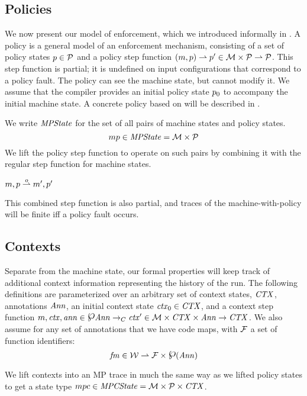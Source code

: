 \documentclass[acmsmall,review,anonymous]{acmart}\settopmatter{printfolios=true,printccs=false,printacmref=false}
\newcommand{\powerset}{\raisebox{.15\baselineskip}{\Large\ensuremath{\wp}}}
\begin{document}
\subsection{Policies}

We now present our model of enforcement, which we introduced informally in .
A policy is a general model of an enforcement mechanism, consisting of a set of policy
states \(\pol \in \POLS\) and a policy step function \((\mach, \pol) \polstep \pol' \in
\MACHS \times \POLS \rightharpoonup \POLS\). This step function is partial;
it is undefined on input configurations that correspond to a policy fault. The policy
can see the machine state, but cannot modify it. We assume that the
compiler provides an initial policy state \(\pol_0\) to accompany the initial machine state.
%
A concrete policy based on \citet{DBLP:conf/sp/RoesslerD18} will be described in
.

We write $\MPS$ for the set of all pairs of machine states and policy
states.
%
\[\mpstatename \in \MPS = \MACHS \times \POLS\]
%
We lift the policy step function to operate on such pairs
by combining it with the regular step function for machine states.

            {\(\mpstate{\mach}{\pol} \stepstopol[\obs]
               \mpstate{\mach'}{\pol'}\)}

This combined step function is also partial, and traces of the machine-with-policy
will be finite iff a policy fault occurs.

\subsection{Contexts}

Separate from the machine state, our formal properties will keep track of additional context
information representing the history of the run. The following definitions are parameterized
over an arbitrary set of context states, \(\CONTEXTS\), annotations \(\ANNS\),
an initial context state \(\context_0 \in \CONTEXTS\), and a context step function
\(\mach, \context, \ann \in \powerset \ANNS \constep \context' \in \MACHS \times \CONTEXTS
\times \ANNS \rightarrow \CONTEXTS\). We also assume for any set of annotations that we have
code maps, with \(\FUNIDS\) a set of function identifiers:
\[\codemap \in \WORDS \rightharpoonup \FUNIDS \times \powerset(\ANNS)\]

We lift contexts into an MP trace in much the same way as we lifted policy states to get
a state type \(\mpcstatename \in \MPCS = \MACHS \times \POLS \times \CONTEXTS\).
\end{document}

